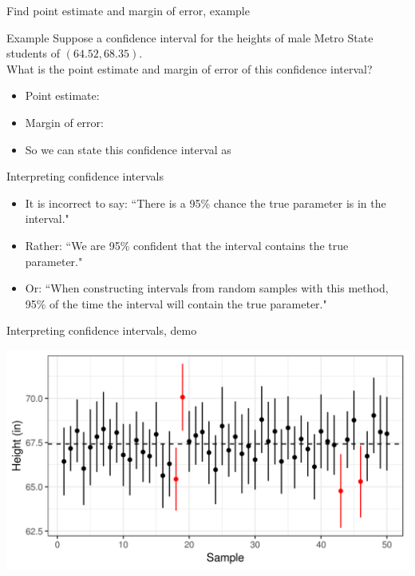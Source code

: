 \documentclass[xcolor=table, aspectratio=169, bigger, handout]{beamer}
\begin{document}
\begin{frame}{Find point estimate and margin of error, example}
\begin{exampleblock}{Example}
Suppose a confidence interval for the heights of male Metro State students of $(64.52, 68.35)$.\\
\smallskip
 What is the point estimate and margin of error of this confidence interval?\\
\begin{itemize}
\pause\item Point estimate:\\ \smallskip
{}
\pause\item Margin of error:\\ \smallskip
{}
\pause\item So we can state this confidence interval as\\ \smallskip
{}
\end{itemize}
\end{exampleblock}

\end{frame}

\begin{frame}{Interpreting confidence intervals}

\begin{block}{}
\begin{itemize}
\item It is incorrect to say: ``There is a 95\% chance the true parameter is in the interval."
\pause\item Rather: ``We are 95\% confident that the interval contains the true parameter."
\pause\item Or: ``When constructing intervals from random samples with this method, 95\% of the time the interval will contain the true parameter."
\end{itemize}
\end{block}

\end{frame}

\begin{frame}{Interpreting confidence intervals, demo}

{\centering
\includegraphics[width=5.5in]{../images/wk07_metro_hgts_cis}
\par}
\end{frame}
\end{document}
